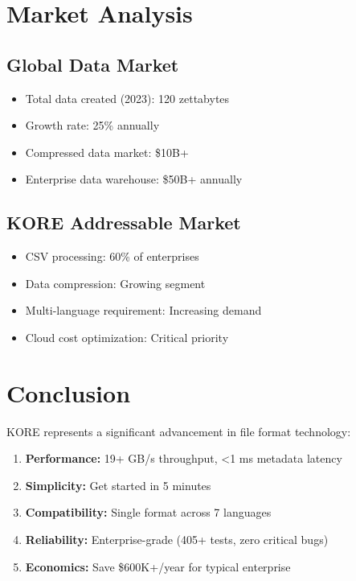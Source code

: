 \documentclass{article}
\begin{document}
\section*{Market Analysis}

\subsection*{Global Data Market}

\begin{itemize}
    \item Total data created (2023): 120 zettabytes
    \item Growth rate: 25\% annually
    \item Compressed data market: \$10B+
    \item Enterprise data warehouse: \$50B+ annually
\end{itemize}

\subsection*{KORE Addressable Market}

\begin{itemize}
    \item CSV processing: 60\% of enterprises
    \item Data compression: Growing segment
    \item Multi-language requirement: Increasing demand
    \item Cloud cost optimization: Critical priority
\end{itemize}

\section*{Conclusion}

KORE represents a significant advancement in file format technology:

\begin{enumerate}
    \item \textbf{Performance:} 19+ GB/s throughput, <1 ms metadata latency
    \item \textbf{Simplicity:} Get started in 5 minutes
    \item \textbf{Compatibility:} Single format across 7 languages
    \item \textbf{Reliability:} Enterprise-grade (405+ tests, zero critical bugs)
    \item \textbf{Economics:} Save \$600K+/year for typical enterprise
\end{enumerate}
\end{document}
